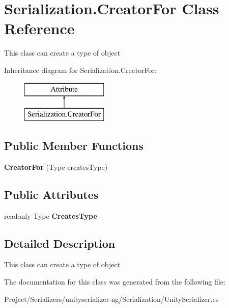 \hypertarget{class_serialization_1_1_creator_for}{}\section{Serialization.\+Creator\+For Class Reference}
\label{class_serialization_1_1_creator_for}


This class can create a type of object  


Inheritance diagram for Serialization.\+Creator\+For\+:\begin{figure}[H]
\begin{center}
\leavevmode
\includegraphics[height=2.000000cm]{class_serialization_1_1_creator_for}
\end{center}
\end{figure}
\subsection*{Public Member Functions}
\begin{DoxyCompactItemize}
\item 
\mbox{\label{class_serialization_1_1_creator_for_a4a5f1680ebe72dea8f522087ad4d2db3}} 
{\bfseries Creator\+For} (Type creates\+Type)
\end{DoxyCompactItemize}
\subsection*{Public Attributes}
\begin{DoxyCompactItemize}
\item 
\mbox{\label{class_serialization_1_1_creator_for_a8c10d6db1b5eeb68cdce9ab14307142f}} 
readonly Type {\bfseries Creates\+Type}
\end{DoxyCompactItemize}


\subsection{Detailed Description}
This class can create a type of object 



The documentation for this class was generated from the following file\+:\begin{DoxyCompactItemize}
\item 
Project/\+Serializers/unityserializer-\/ng/\+Serialization/Unity\+Serializer.\+cs\end{DoxyCompactItemize}
